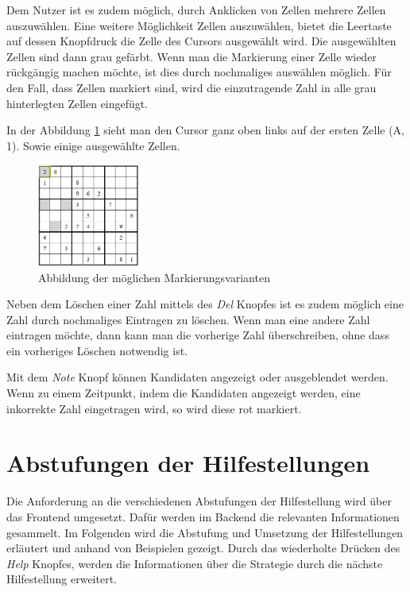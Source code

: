 Dem Nutzer ist es zudem möglich, durch Anklicken von Zellen mehrere Zellen auszuwählen. Eine weitere Möglichkeit Zellen auszuwählen, bietet die Leertaste auf dessen Knopfdruck die Zelle des Cursors ausgewählt wird. Die ausgewählten Zellen sind dann grau gefärbt. Wenn man die Markierung einer Zelle wieder rückgängig machen möchte, ist dies durch nochmaliges auswählen möglich. Für den Fall, dass Zellen markiert sind, wird die einzutragende Zahl in alle grau hinterlegten Zellen eingefügt.

In der Abbildung \ref{fig:Markierungen} sieht man den Cursor ganz oben links auf der ersten Zelle (A, 1). Sowie einige ausgewählte Zellen.

\begin{figure}[H]
	\centering
	\includegraphics[width=0.3\textwidth]{images/Markierungen.png}
	\caption{Abbildung der möglichen Markierungsvarianten}
	\label{fig:Markierungen}
\end{figure}

Neben dem Löschen einer Zahl mittels des \textit{Del} Knopfes ist es zudem möglich eine Zahl durch nochmaliges Eintragen zu löschen. Wenn man eine andere Zahl eintragen möchte, dann kann man die vorherige Zahl überschreiben, ohne dass ein vorheriges Löschen notwendig ist. 

Mit dem \textit{Note} Knopf können Kandidaten angezeigt oder ausgeblendet werden. Wenn zu einem Zeitpunkt, indem die Kandidaten angezeigt werden, eine inkorrekte Zahl eingetragen wird, so wird diese rot markiert.


\section{Abstufungen der Hilfestellungen}\label{Abstufung}
Die Anforderung an die verschiedenen Abstufungen der Hilfestellung wird über das Frontend umgesetzt. Dafür werden im Backend die relevanten Informationen gesammelt. Im Folgenden wird die Abstufung und Umsetzung der Hilfestellungen erläutert und anhand von Beispielen gezeigt. Durch das wiederholte Drücken des \textit{Help} Knopfes, werden die Informationen über die Strategie durch die nächste Hilfestellung erweitert.

